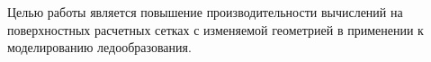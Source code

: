 Целью работы является повышение производительности вычислений на поверхностных расчетных сетках с изменяемой геометрией в применении к моделированию ледообразования.